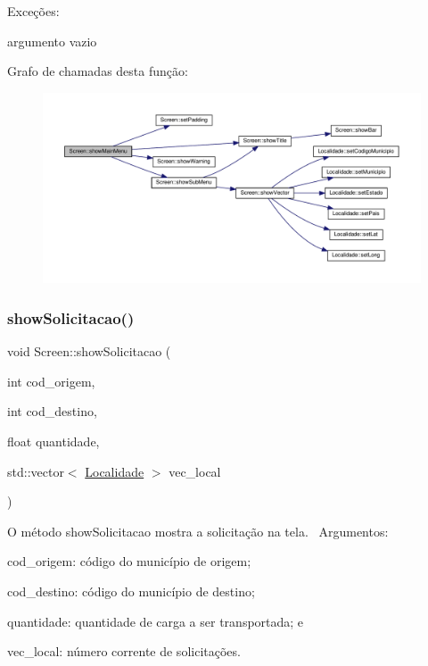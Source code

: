 Exceções\+:
\begin{DoxyItemize}
\item argumento vazio
\end{DoxyItemize}Grafo de chamadas desta função\+:\nopagebreak
\begin{figure}[H]
\begin{center}
\leavevmode
\includegraphics[width=350pt]{classScreen_a3ea61b376ace3fa90b16ba31b01a8107_cgraph}
\end{center}
\end{figure}
\mbox{\label{classScreen_a2f514fb5d139b0b6e8d67c95ee6a2596}} 
\subsubsection{\texorpdfstring{show\+Solicitacao()}{showSolicitacao()}}
{\footnotesize\ttfamily void Screen\+::show\+Solicitacao (\begin{DoxyParamCaption}\item[{int}]{cod\+\_\+origem,  }\item[{int}]{cod\+\_\+destino,  }\item[{float}]{quantidade,  }\item[{std\+::vector$<$ \hyperlink{classLocalidade}{Localidade} $>$}]{vec\+\_\+local }\end{DoxyParamCaption})}

O método show\+Solicitacao mostra a solicitação na tela.~\newline
Argumentos\+:
\begin{DoxyItemize}
\item cod\+\_\+origem\+: código do município de origem;
\item cod\+\_\+destino\+: código do município de destino;
\item quantidade\+: quantidade de carga a ser transportada; e
\item vec\+\_\+local\+: número corrente de solicitações.
\end{DoxyItemize}

